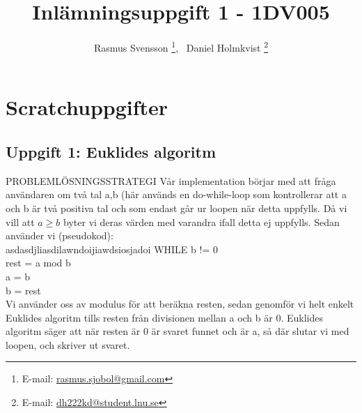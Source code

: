 \documentclass[12pt,a4paper]{article}
\begin{document}
\author{Rasmus Svensson%
  \thanks{E-mail: \href{mailto:rasmus.sjobol@gmail.com}{rasmus.sjobol@gmail.com}}, \ {Daniel Holmkvist%
  \thanks{E-mail: \href{mailto:dh222kd@student.lnu.se}{dh222kd@student.lnu.se}}}}
\title{Inlämningsuppgift 1 - 1DV005}
\maketitle
\tableofcontents
\newpage
\section{Scratchuppgifter}
\subsection{Uppgift 1: Euklides algoritm}
PROBLEMLÖSNINGSSTRATEGI 
Vår implementation börjar med att fråga användaren om två tal a,b (här används en do-while-loop som kontrollerar att a och b är två positiva tal och som endast går ur loopen när detta uppfylls. Då vi vill att $ a \geq b$ byter vi deras värden med varandra ifall detta ej uppfylls. Sedan använder vi (pseudokod): 
\\asdasdjliasdilawndoijiawdsiosjadoi
WHILE b != 0         \\
 	rest = a mod b \\
	a = b \\
	b = rest \\ 
	
Vi använder oss av modulus för att beräkna resten, sedan genomför vi helt enkelt Euklides algoritm tills resten från divisionen mellan a och b är 0. Euklides algoritm säger att när resten är 0 är svaret funnet och är a, så där slutar vi med loopen, och skriver ut svaret. \\
\end{document}
